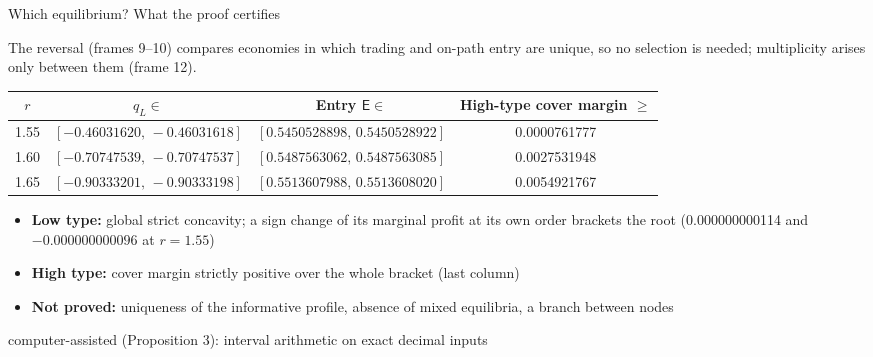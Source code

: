 \documentclass[10pt,aspectratio=169]{beamer}
\newcommand{\Status}[1]{{\color{cGrayText}\scriptsize #1}}
\newcommand{\NavGap}{\par\vspace{0.45cm}}%
\let\AdapterBackButton\BackButton
\renewcommand{\BackButton}[1]{\NavGap\AdapterBackButton{#1}}%
\begin{document}
\begin{frame}[label=A21]{Which equilibrium? What the proof certifies}
\hypertarget{app:cert}{}
\vspace{5pt}
{\small The reversal (frames 9--10) compares economies in which trading and on-path entry are unique, so no selection is needed; multiplicity arises only between them (frame 12).\par}
\vspace{4pt}
\begin{center}\footnotesize
\begin{tabular}{@{}cccc@{}}
\toprule
$r$ & $q_L\in$ & Entry $\mathsf E\in$ & High-type cover margin $\ge$\\
\midrule
1.55 %
 & $[-0.46031620,\,-0.46031618]$ %
 & $[0.5450528898,\,0.5450528922]$ %
 & 0.0000761777\\ %
1.60 %
 & $[-0.70747539,\,-0.70747537]$ %
 & $[0.5487563062,\,0.5487563085]$ %
 & 0.0027531948\\ %
1.65 %
 & $[-0.90333201,\,-0.90333198]$ %
 & $[0.5513607988,\,0.5513608020]$ %
 & 0.0054921767\\ %
\bottomrule
\end{tabular}
\end{center}
\vspace{-4pt}
{\small
\begin{itemize}\setlength{\itemsep}{2pt}
\item \textbf{Low type:} global strict concavity; a sign change of its marginal profit at its own order brackets the root (0.000000000114 %
and $-0.000000000096$ at $r=1.55$) %
\item \textbf{High type:} cover margin strictly positive over the whole bracket (last column)
\item \textbf{Not proved:} uniqueness of the informative profile, absence of mixed equilibria, a branch between nodes
\end{itemize}}
\Status{computer-assisted (Proposition 3): interval arithmetic on exact decimal inputs}\par
{}
\end{frame}
\end{document}

